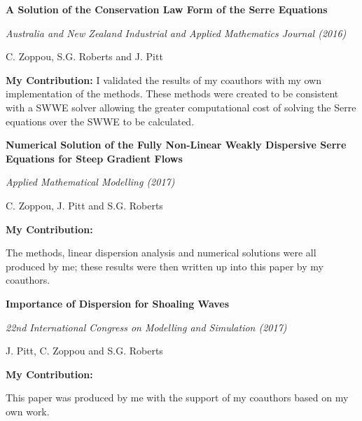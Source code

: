 \begin{center}
	\textbf{
		\Large A Solution of the Conservation Law Form of the Serre Equations}
	
	\vspace*{\baselineskip}
	
	\textit{Australia and New Zealand Industrial and Applied Mathematics Journal (2016)}
	
	{C. Zoppou, S.G. Roberts and J. Pitt}
	\vspace*{0.5\baselineskip}
\end{center}
\textbf{My Contribution:}
I validated the results of my coauthors with my own implementation of the methods. These methods were created to be consistent with a SWWE solver allowing the greater computational cost of solving the Serre equations over the SWWE to be calculated.  
\vspace*{\baselineskip}
\begin{center}
	\textbf{
		\Large Numerical Solution of the Fully Non-Linear Weakly Dispersive
		Serre Equations for Steep Gradient Flows}
	
	\vspace*{\baselineskip}
	
	\textit{Applied Mathematical Modelling (2017)}
	
	{C. Zoppou, J. Pitt and S.G. Roberts}
	\vspace*{0.5\baselineskip}
\end{center}
\textbf{My Contribution:}

The methods, linear dispersion analysis and numerical solutions were all produced by me; these results were then written up into this paper by my coauthors. 

\vspace*{\baselineskip}
\begin{center}
	\textbf{
		\Large Importance of Dispersion for Shoaling Waves}
	
	\vspace*{\baselineskip}
	
	\textit{22nd International Congress on Modelling and Simulation (2017)}
	
	{J. Pitt, C. Zoppou and S.G. Roberts}
	\vspace*{0.5\baselineskip}
\end{center}
 \textbf{My Contribution:}
 
 This paper was produced by me with the support of my coauthors based on my own work.
 
 \vspace*{\baselineskip}
 

